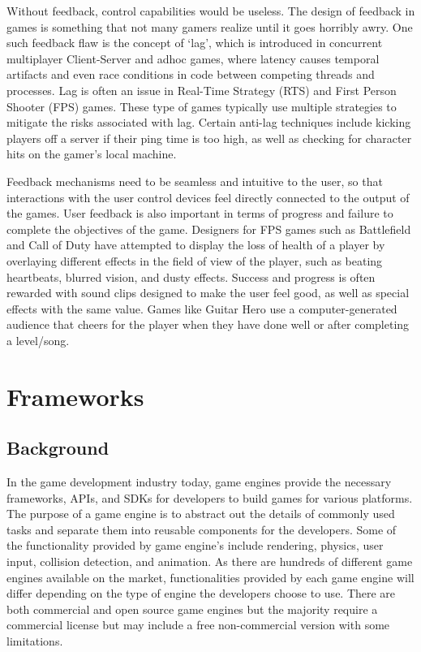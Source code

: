 Without feedback, control capabilities would be useless. The design of feedback in games is something that not many gamers realize until it goes horribly awry. One such feedback flaw is the concept of ‘lag’, which is introduced in concurrent multiplayer Client-Server and adhoc games, where latency causes temporal artifacts and even race conditions in code between competing threads and processes. Lag is often an issue in Real-Time Strategy (RTS) and First Person Shooter (FPS) games. These type of games typically use multiple strategies to mitigate the risks associated with lag. Certain anti-lag techniques include kicking players off a server if their ping time is too high, as well as checking for character hits on the gamer’s local machine.

Feedback mechanisms need to be seamless and intuitive to the user, so that interactions with the user control devices feel directly connected to the output of the games. User feedback is also important in terms of progress and failure to complete the objectives of the game. Designers for FPS games such as Battlefield and Call of Duty have attempted to display the loss of health of a player by overlaying different effects in the field of view of the player, such as beating heartbeats, blurred vision, and dusty effects. Success and progress is often rewarded with sound clips designed to make the user feel good, as well as special effects with the same value. Games like Guitar Hero use a computer-generated audience that cheers for the player when they have done well or after completing a level/song.

\section{Frameworks}

\subsection{Background}
In the game development industry today, game engines provide the necessary frameworks, APIs, and SDKs for developers to build games for various platforms. The purpose of a game engine is to abstract out the details of commonly used tasks and separate them into reusable components for the developers. Some of the functionality provided by game engine's include rendering, physics, user input, collision detection, and animation. As there are hundreds of different game engines available on the market, functionalities provided by each game engine will differ depending on the type of engine the developers choose to use. There are both commercial and open source game engines but the majority require a commercial license but may include a free non-commercial version with some limitations.

